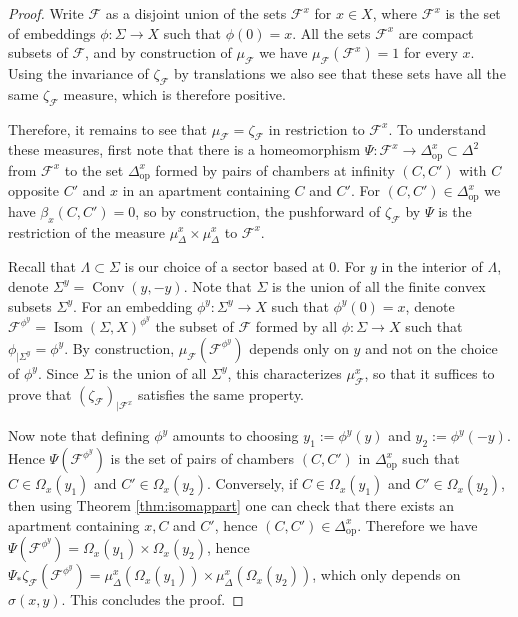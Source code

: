 \documentclass[a4paper, 11pt]{article}
\theoremstyle{plain}
\theoremstyle{definition}
\theoremstyle{remark}
\DeclareMathOperator{\Conv}{Conv}
\DeclareMathOperator{\Isom}{Isom}
\newcommand{\scrF}{\mathscr F}
\newcommand{\op}{\mathrm{op}}
\begin{document}
\begin{proof}
Write $\scrF$ as a disjoint union of the sets $\scrF^x$ for $x\in X$, where $\scrF^x$ is the set of embeddings $\phi:\Sigma\to X$ such that $\phi(0)=x$. All the sets $\scrF^x$ are compact subsets of $\scrF$, and by construction of $\mu_\scrF$ we have $\mu_\scrF(\scrF^x)=1$ for every $x$. Using the invariance of $\zeta_\scrF$ by translations we also see that these sets have all the same $\zeta_\scrF$ measure, which is therefore positive.

Therefore, it remains to see that $\mu_\scrF=\zeta_\scrF$ in restriction to $\scrF^x$. To understand these measures, first note that there is a homeomorphism $\Psi:\scrF^x\to\Delta^{x}_\op\subset \Delta^2$ from $\scrF^x$ to the set $\Delta^x_\op$ formed by pairs of  chambers at infinity $(C,C')$ with $C$ opposite $C'$ and $x$ in an apartment containing $C$ and $C'$. For $(C,C')\in \Delta^x_\op$ we have $\beta_x(C,C')=0$, so by construction, the pushforward of $\zeta_{\scrF}$ by $\Psi$ is the restriction of the measure $\mu^x_\Delta\times \mu^x_\Delta$ to $\scrF^x$.

Recall that $\Lambda\subset \Sigma$ is our choice of a sector based at $0$. For $y$ in the interior of  $\Lambda$, denote $\Sigma^y=\Conv(y,-y)$. Note that $\Sigma$ is the union of all the finite convex subsets $\Sigma^y$. For an embedding $\phi^y:\Sigma^y\to X$ such that $\phi^y(0)=x$, denote $\scrF^{\phi^y}=\Isom(\Sigma,X)^{\phi^y}$ the subset of $\scrF$ formed by all $\phi:\Sigma\to X$ such that $\phi_{|\Sigma^y}=\phi^y$. By construction, $\mu_\scrF(\scrF^{\phi^y})$ depends only on $y$ and not on the choice of $\phi^y$. Since $\Sigma$ is the union of all $\Sigma^y$, this characterizes $\mu_\scrF^x$, so that it suffices to prove that $(\zeta_\scrF)_{|\scrF^x}$ satisfies the same property.

Now note that  defining $\phi^y$ amounts to choosing $y_1:=\phi^y(y)$ and  $y_2:=\phi^y(-y)$. Hence $\Psi(\scrF^{\phi^y})$ is the set of pairs of chambers $(C,C')$ in $\Delta^{x}_\op$ such that $C\in \Omega_x(y_1)$ and $C'\in \Omega_x(y_2)$.  Conversely, if $C\in \Omega_x(y_1)$ and $C'\in \Omega_x(y_2)$, then using Theorem \ref{thm:isomappart} one can check that there exists an apartment containing $x,C$ and $C'$, hence $(C,C')\in \Delta_\op^x$. Therefore we have $\Psi(\scrF^{\phi^y})=\Omega_x(y_1)\times \Omega_x(y_2)$, hence $\Psi_*\zeta_\scrF(\scrF^{\phi^y})=\mu^x_\Delta(\Omega_x(y_1))\times\mu_\Delta^x(\Omega_x(y_2))$, which only depends on $\sigma(x,y)$. This concludes the proof.
\end{proof}
\end{document}
